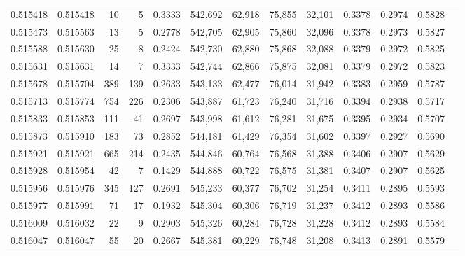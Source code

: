 \begin{tabular}{rrrrrrrrrrrrr}
0.515418 & 0.515418 &    10 &     5 &                                     0.3333 & 542,692 &  62,918 &  75,855 &  32,101 & 0.3378 & 0.2974 & 0.5828 \\
0.515473 & 0.515563 &    13 &     5 &                                     0.2778 & 542,705 &  62,905 &  75,860 &  32,096 & 0.3378 & 0.2973 & 0.5827 \\
0.515588 & 0.515630 &    25 &     8 &                                     0.2424 & 542,730 &  62,880 &  75,868 &  32,088 & 0.3379 & 0.2972 & 0.5825 \\
0.515631 & 0.515631 &    14 &     7 &                                     0.3333 & 542,744 &  62,866 &  75,875 &  32,081 & 0.3379 & 0.2972 & 0.5823 \\
0.515678 & 0.515704 &   389 &   139 &                                     0.2633 & 543,133 &  62,477 &  76,014 &  31,942 & 0.3383 & 0.2959 & 0.5787 \\
0.515713 & 0.515774 &   754 &   226 &                                     0.2306 & 543,887 &  61,723 &  76,240 &  31,716 & 0.3394 & 0.2938 & 0.5717 \\
0.515833 & 0.515853 &   111 &    41 &                                     0.2697 & 543,998 &  61,612 &  76,281 &  31,675 & 0.3395 & 0.2934 & 0.5707 \\
0.515873 & 0.515910 &   183 &    73 &                                     0.2852 & 544,181 &  61,429 &  76,354 &  31,602 & 0.3397 & 0.2927 & 0.5690 \\
0.515921 & 0.515921 &   665 &   214 &                                     0.2435 & 544,846 &  60,764 &  76,568 &  31,388 & 0.3406 & 0.2907 & 0.5629 \\
0.515928 & 0.515954 &    42 &     7 &                                     0.1429 & 544,888 &  60,722 &  76,575 &  31,381 & 0.3407 & 0.2907 & 0.5625 \\
0.515956 & 0.515976 &   345 &   127 &                                     0.2691 & 545,233 &  60,377 &  76,702 &  31,254 & 0.3411 & 0.2895 & 0.5593 \\
0.515977 & 0.515991 &    71 &    17 &                                     0.1932 & 545,304 &  60,306 &  76,719 &  31,237 & 0.3412 & 0.2893 & 0.5586 \\
0.516009 & 0.516032 &    22 &     9 &                                     0.2903 & 545,326 &  60,284 &  76,728 &  31,228 & 0.3412 & 0.2893 & 0.5584 \\
0.516047 & 0.516047 &    55 &    20 &                                     0.2667 & 545,381 &  60,229 &  76,748 &  31,208 & 0.3413 & 0.2891 & 0.5579 \\

\end{tabular}
